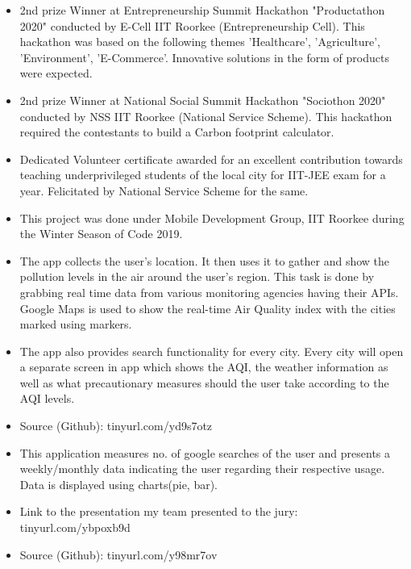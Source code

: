\begin{itemize}
\item 2nd prize Winner at Entrepreneurship Summit Hackathon "Productathon 2020" conducted by E-Cell IIT Roorkee (Entrepreneurship Cell). This hackathon was based on the following themes {'Healthcare', 'Agriculture', 'Environment', 'E-Commerce'}. Innovative solutions in the form of products were expected.
\item 2nd prize Winner at National Social Summit Hackathon "Sociothon 2020" conducted by NSS IIT Roorkee (National Service Scheme). This hackathon required the contestants to build a Carbon footprint calculator.
\item Dedicated Volunteer certificate awarded for an excellent contribution towards teaching underprivileged students of the local city for IIT-JEE exam for a year. Felicitated by National Service Scheme for the same.
\end{itemize}





\begin{itemize}
\item This project was done under Mobile Development Group, IIT Roorkee during the Winter Season of Code 2019.
\item The app collects the user’s location. It then uses it to gather and show the pollution levels in the air around the user’s region. This task is done by grabbing real time data from various monitoring agencies having their APIs. Google Maps is used to show the real-time Air Quality index with the cities marked using markers.
\item The app also provides search functionality for every city. Every city will open a separate screen in app which shows the AQI, the weather information as well as what precautionary measures should the user take according to the AQI levels.
\item Source (Github): tinyurl.com/yd9s7otz
\end{itemize}

\begin{itemize}
\item This application measures no. of google searches of the user and presents a weekly/monthly data indicating the user regarding their respective usage. Data is displayed using charts(pie, bar).
\item Link to the presentation my team presented to the jury: tinyurl.com/ybpoxb9d
\item Source (Github): tinyurl.com/y98mr7ov
\end{itemize}

